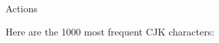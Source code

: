 




\vspace{\myLineheight}\begin{multicols}{2}\raggedcolumns{}

\end{multicols}


{\mktsHTwo{}Actions\mktsHTwoBeg}%


\vspace{\myLineheight}\begin{multicols}{2}\raggedcolumns{}Here are the 1000 most frequent CJK characters:

\cjkgGlue{}\cjkgGlue{}\cjkgGlue{}\cjkgGlue{}\cjkgGlue{}\cjkgGlue{}\cjkgGlue{}\cjkgGlue{}\cjkgGlue{}\cjkgGlue{}\cjkgGlue{}\cjkgGlue{}\cjkgGlue{}\cjkgGlue{}\cjkgGlue{}\cjkgGlue{}\cjkgGlue{}\cjkgGlue{}\cjkgGlue{}\cjkgGlue{}\cjkgGlue{}\cjkgGlue{}\cjkgGlue{}\cjkgGlue{}\cjkgGlue{}\cjkgGlue{}\cjkgGlue{}\cjkgGlue{}\cjkgGlue{}\cjkgGlue{}\cjkgGlue{}\cjkgGlue{}\cjkgGlue{}\cjkgGlue{}\cjkgGlue{}\cjkgGlue{}\cjkgGlue{}\cjkgGlue{}\cjkgGlue{}\cjkgGlue{}\cjkgGlue{}\cjkgGlue{}\cjkgGlue{}\cjkgGlue{}\cjkgGlue{}\cjkgGlue{}\cjkgGlue{}\cjkgGlue{}\cjkgGlue{}\cjkgGlue{}\cjkgGlue{}\cjkgGlue{}\cjkgGlue{}\cjkgGlue{}\cjkgGlue{}\cjkgGlue{}\cjkgGlue{}\cjkgGlue{}\cjkgGlue{}\cjkgGlue{}\cjkgGlue{}\cjkgGlue{}\cjkgGlue{}\cjkgGlue{}\cjkgGlue{}\cjkgGlue{}\cjkgGlue{}\cjkgGlue{}\cjkgGlue{}\cjkgGlue{}\cjkgGlue{}\cjkgGlue{}\cjkgGlue{}\cjkgGlue{}\cjkgGlue{}\cjkgGlue{}\cjkgGlue{}\cjkgGlue{}\cjkgGlue{}\cjkgGlue{}\cjkgGlue{}\cjkgGlue{}\cjkgGlue{}\cjkgGlue{}\cjkgGlue{}\cjkgGlue{}\cjkgGlue{}\
\end{multicols}
